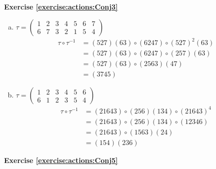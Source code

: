 \noindent\textbf{Exercise \ref{exercise:actions:Conj3}}
\begin{enumerate}[(a)]
\item 
$\tau=\begin{pmatrix}1&2&3&4&5&6&7\\6&7&3&2&1&5&4
\end{pmatrix}$
\begin{align*}
\tau \circ \tau^{-1} &= (527)(63) \circ (6247) \circ (527)^2 (63)
\\
&= (527)(63) \circ (6247)\circ (257)(63)
\\
&= (527)(63) \circ (2563)(47)
\\
&= (3745)
\end{align*}

\item
$\tau=\begin{pmatrix}1&2&3&4&5&6\\6&1&2&3&5&4
\end{pmatrix}$
\begin{align*}
\tau \circ \tau^{-1} &= (21643) \circ (256)(134) \circ (21643)^4
\\
&= (21643) \circ (256)(134) \circ (12346)
\\
&= (21643) \circ (1563)(24)
\\
&= (154)(236)
\end{align*}

\end{enumerate}

\noindent\textbf{Exercise \ref{exercise:actions:Conj5}}

